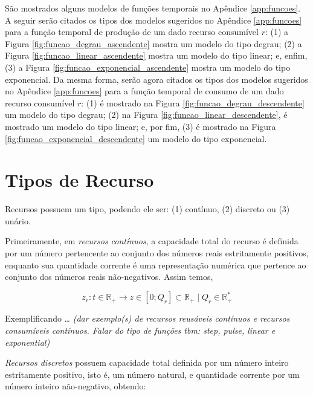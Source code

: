         São mostrados alguns modelos de funções temporais no Apêndice \ref{app:funcoes}. A seguir serão citados os tipos dos modelos sugeridos no Apêndice \ref{app:funcoes} para a função temporal de produção de um dado recurso consumível $r$: (1) a Figura \ref{fig:funcao_degrau_ascendente} mostra um modelo do tipo degrau; (2) a Figura \ref{fig:funcao_linear_ascendente} mostra um modelo do tipo linear; e, enfim, (3) a Figura \ref{fig:funcao_exponencial_ascendente} mostra um modelo do tipo exponencial. Da mesma forma, serão agora citados os tipos dos modelos sugeridos no Apêndice \ref{app:funcoes} para a função temporal de consumo de um dado recurso consumível $r$: (1) é mostrado na Figura \ref{fig:funcao_degrau_descendente} um modelo do tipo degrau; (2) na Figura \ref{fig:funcao_linear_descendente}, é mostrado um modelo do tipo linear; e, por fim, (3) é mostrado na Figura \ref{fig:funcao_exponencial_descendente} um modelo do tipo exponencial.
        
    \section{Tipos de Recurso} \label{sec:tipos_recurso}
    
        Recursos possuem um tipo, podendo ele ser: (1) contínuo, (2) discreto ou (3) unário. 
        
        Primeiramente, em \textit{recursos contínuos}, a capacidade total do recurso é definida por um número pertencente ao conjunto dos números reais estritamente positivos, enquanto sua quantidade corrente é uma representação numérica que pertence ao conjunto dos números reais não-negativos. Assim temos, 
        
        \begin{equation} \label{eq:recurso_continuo}
            z_r: t \in \mathbb{R}_+ \to z \in [0; Q_r] \subset \mathbb{R}_+ \mid Q_r \in \mathbb{R}_+^*
        \end{equation}
        
        Exemplificando \dots \emph{\color{red} (dar exemplo(s) de recursos reusáveis contínuos e recursos consumíveis contínuos. Falar do tipo de funções tbm: \textit{step}, \textit{pulse}, \textit{linear} e \textit{exponential})}
        
        \textit{Recursos discretos} possuem capacidade total definida por um número inteiro estritamente positivo, isto é, um número natural, e quantidade corrente por um número inteiro não-negativo, obtendo:
        
